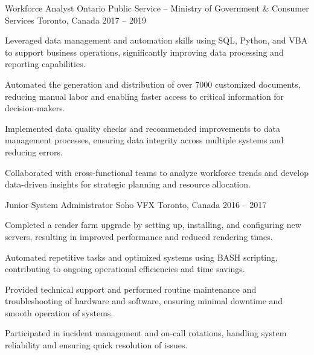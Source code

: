 \begin{cventries}
\cventry%
	{Workforce Analyst}
	{Ontario Public Service -- Ministry of Government \& Consumer Services}
	{Toronto, Canada}
	{2017 -- 2019}
	{
		\begin{cvitems}
			\item Leveraged data management and automation skills using SQL, Python, and VBA to support business operations, significantly improving data processing and reporting capabilities.
			\item Automated the generation and distribution of over 7000 customized documents, reducing manual labor and enabling faster access to critical information for decision-makers.
			\item Implemented data quality checks and recommended improvements to data management processes, ensuring data integrity across multiple systems and reducing errors.
			\item Collaborated with cross-functional teams to analyze workforce trends and develop data-driven insights for strategic planning and resource allocation.
		\end{cvitems}
	}

\cventry%
	{Junior System Administrator}
	{Soho VFX}
	{Toronto, Canada}
	{2016 -- 2017}
	{
		\begin{cvitems}
			\item Completed a render farm upgrade by setting up, installing, and configuring new servers, resulting in improved performance and reduced rendering times.
			\item Automated repetitive tasks and optimized systems using BASH scripting, contributing to ongoing operational efficiencies and time savings.
			\item Provided technical support and performed routine maintenance and troubleshooting of hardware and software, ensuring minimal downtime and smooth operation of systems.
			\item Participated in incident management and on-call rotations, handling system reliability and ensuring quick resolution of issues.
		\end{cvitems}
	}

\end{cventries}
